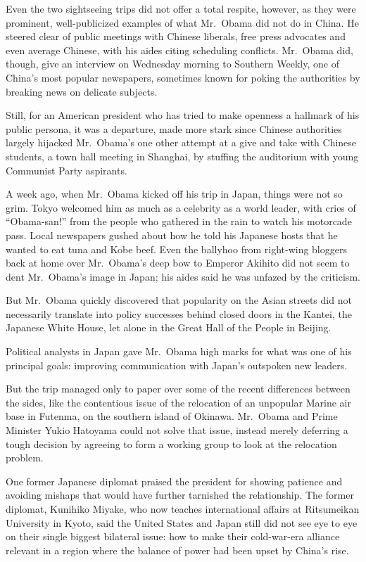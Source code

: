 ﻿\documentclass[12pt]{article}
\begin{document}
Even the two sightseeing trips did not offer a total respite, however, as they were prominent,
well-publicized examples of what Mr.~Obama did not do in China. He steered clear of public meetings
with Chinese liberals, free press advocates and even average Chinese, with his aides citing
scheduling conflicts. Mr.~Obama did, though, give an interview on Wednesday morning to Southern
Weekly, one of China's most popular newspapers, sometimes known for poking the authorities by
breaking news on delicate subjects.

Still, for an American president who has tried to make openness a hallmark of his public persona, it
was a departure, made more stark since Chinese authorities largely hijacked Mr.~Obama's one other
attempt at a give and take with Chinese students, a town hall meeting in Shanghai, by stuffing the
auditorium with young Communist Party aspirants.

A week ago, when Mr.~Obama kicked off his trip in Japan, things were not so grim. Tokyo welcomed him
as much as a celebrity as a world leader, with cries of ``Obama-san!'' from the people who gathered
in the rain to watch his motorcade pass. Local newspapers gushed about how he told his Japanese
hosts that he wanted to eat tuna and Kobe beef. Even the ballyhoo from right-wing bloggers back at
home over Mr.~Obama's deep bow to Emperor Akihito did not seem to dent Mr.~Obama's image in Japan;
his aides said he was unfazed by the criticism.

But Mr.~Obama quickly discovered that popularity on the Asian streets did not necessarily translate
into policy successes behind closed doors in the Kantei, the Japanese White House, let alone in the
Great Hall of the People in Beijing.

Political analysts in Japan gave Mr.~Obama high marks for what was one of his principal goals:
improving communication with Japan's outspoken new leaders.

But the trip managed only to paper over some of the recent differences between the sides, like the
contentious issue of the relocation of an unpopular Marine air base in Futenma, on the southern
island of Okinawa. Mr.~Obama and Prime Minister Yukio Hatoyama could not solve that issue, instead
merely deferring a tough decision by agreeing to form a working group to look at the relocation
problem.

One former Japanese diplomat praised the president for showing patience and avoiding mishaps that
would have further tarnished the relationship. The former diplomat, Kunihiko Miyake, who now teaches
international affairs at Ritsumeikan University in Kyoto, said the United States and Japan still did
not see eye to eye on their single biggest bilateral issue: how to make their cold-war-era alliance
relevant in a region where the balance of power had been upset by China's rise.
\end{document}
